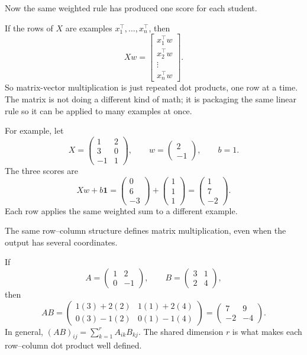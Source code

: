 Now the same weighted rule has produced one score for each student.

If the rows of \(X\) are examples \(x_1^\top,\ldots,x_n^\top\), then
\[
Xw=
\begin{bmatrix}
x_1^\top w\\
x_2^\top w\\
\vdots\\
x_n^\top w
\end{bmatrix}.
\]
So matrix-vector multiplication is just repeated dot products, one row at a time. The matrix is not doing a different kind of math; it is packaging the same linear rule so it can be applied to many examples at once.

For example, let
\[
X=\begin{pmatrix}1&2\\3&0\\-1&1\end{pmatrix},
\qquad w=\begin{pmatrix}2\\-1\end{pmatrix},\qquad b=1.
\]
The three scores are
\[
Xw+b\mathbf{1}=\begin{pmatrix}0\\6\\-3\end{pmatrix}
+\begin{pmatrix}1\\1\\1\end{pmatrix}
=\begin{pmatrix}1\\7\\-2\end{pmatrix}.
\]
Each row applies the same weighted sum to a different example.

The same row--column structure defines matrix multiplication, even when the output has several coordinates.

If
\[
A=\begin{pmatrix}1&2\\0&-1\end{pmatrix},
\qquad B=\begin{pmatrix}3&1\\2&4\end{pmatrix},
\]
then
\[
AB=\begin{pmatrix}1(3)+2(2)&1(1)+2(4)\\
0(3)-1(2)&0(1)-1(4)\end{pmatrix}
=\begin{pmatrix}7&9\\-2&-4\end{pmatrix}.
\]
In general, $(AB)_{ij}=\sum_{k=1}^{r}A_{ik}B_{kj}$. The shared
dimension $r$ is what makes each row--column dot product well defined.

